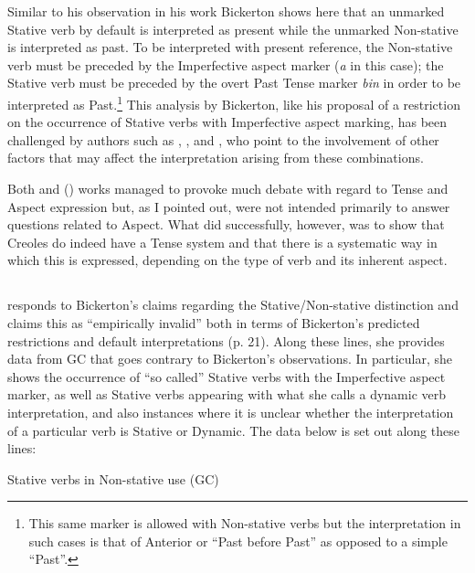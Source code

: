 Similar to his observation in his \citeyear{Bickerton1975} work Bickerton shows here
that an unmarked Stative verb by default is interpreted as present
while the unmarked Non-stative is interpreted as past.  To be
interpreted with present reference, the Non-stative verb must be
preceded by the Imperfective aspect marker (\textit{a} in this case);
the Stative verb must be preceded by the overt Past Tense marker
\textit{bin} in order to be interpreted as Past.\footnote{This same
  marker is allowed with Non-stative verbs but the interpretation in
  such cases is that of Anterior or ``Past before Past'' as opposed to a
  simple ``Past''.}  This analysis by Bickerton, like his proposal of
a restriction on the occurrence of Stative verbs with Imperfective
aspect marking, has been challenged by authors such as
\citet{Jaganauth1987}, \citet{Winford1993}, and \citet{Gooden2008}, who
point to the involvement of other factors that may affect the
interpretation arising from these combinations.

Both  and (\citeyear{Bickerton1981}) works managed to provoke much
debate with regard to Tense and Aspect expression but, as I pointed
out, were not intended primarily to answer questions related to
Aspect.  What \citet{Bickerton1975} did successfully, however, was to
show that Creoles do indeed have a Tense system and that there is a
systematic way in which this is expressed, depending on the type of
verb and its inherent aspect.

\subsection{\citet{Jaganauth1987}}\label{sec:jaganauth}

\citet{Jaganauth1987} responds to Bickerton’s claims regarding the
Stative\slash Non-sta\-tive distinction and claims this as “empirically
invalid” both in terms of Bickerton’s predicted restrictions and
default interpretations (p. 21). Along these lines, she provides data
from GC that goes contrary to Bickerton’s observations.  In
particular, she shows the occurrence of “so called” Stative verbs with
the Imperfective aspect marker, as well as Stative verbs appearing
with what she calls a dynamic verb interpretation, and also instances
where it is unclear whether the interpretation of a particular verb is
Stative or Dynamic.  The data below is set out along these lines:

\ea%
\label{ex:2:10}
Stative verbs in Non-stative use (GC)\\


